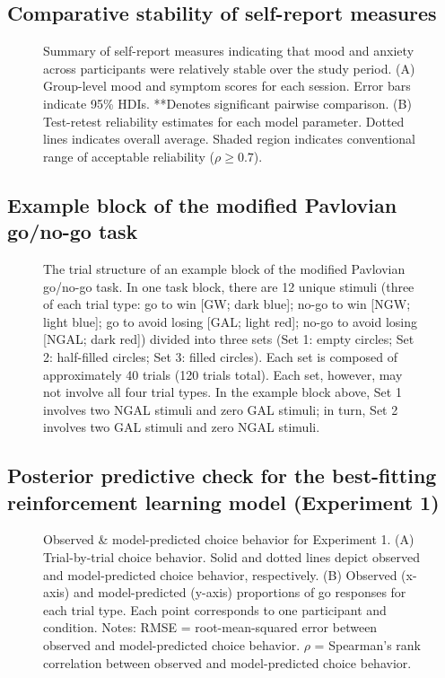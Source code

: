 \documentclass[a4paper,12pt]{article}
\begin{document}
\begin{refsection}[supp]
\clearpage
\subsection*{Comparative stability of self-report measures}

\begin{figure}[h]
    \centerline{}
    \caption{Summary of self-report measures indicating that mood and anxiety across participants were relatively stable over the study period. (A) Group-level mood and symptom scores for each session. Error bars indicate 95\% HDIs. **Denotes significant pairwise comparison. (B) Test-retest reliability estimates for each model parameter. Dotted lines indicates overall average. Shaded region indicates conventional range of acceptable reliability ($\rho \geq 0.7$).}
    \label{fig:figS05}
\end{figure}

\break
\subsection*{Example block of the modified Pavlovian go/no-go task}

\begin{figure}[h]
    \centerline{}
    \caption{The trial structure of an example block of the modified Pavlovian go/no-go task. In one task block, there are 12 unique stimuli (three of each trial type: go to win [GW; dark blue]; no-go to win [NGW; light blue]; go to avoid losing [GAL; light red]; no-go to avoid losing [NGAL; dark red]) divided into three sets (Set 1: empty circles; Set 2: half-filled circles; Set 3: filled circles). Each set is composed of approximately 40 trials (120 trials total). Each set, however, may not involve all four trial types. In the example block above, Set 1 involves two NGAL stimuli and zero GAL stimuli; in turn, Set 2 involves two GAL stimuli and zero NGAL stimuli.}
    \label{fig:figS01}
\end{figure}

\break
\subsection*{Posterior predictive check for the best-fitting reinforcement learning model (Experiment 1)}

\begin{figure}[h]
    \centerline{}
    \caption{Observed \& model-predicted choice behavior for Experiment 1. (A) Trial-by-trial choice behavior. Solid and dotted lines depict observed and model-predicted choice behavior, respectively. (B) Observed (x-axis) and model-predicted (y-axis) proportions of go responses for each trial type. Each point corresponds to one participant and condition. Notes: RMSE = root-mean-squared error between observed and model-predicted choice behavior. $\rho$ = Spearman's rank correlation between observed and model-predicted choice behavior.}
    \label{fig:exp1_ppc}
\end{figure}


\end{refsection}
\end{document}
